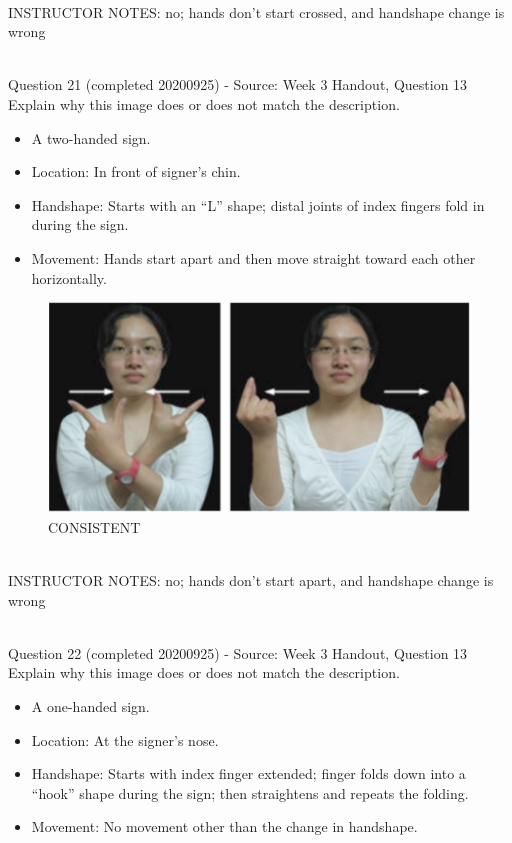 \documentclass[12pt]{article}
\begin{document}
~\\
INSTRUCTOR NOTES: no; hands don't start crossed, and handshape change is wrong


~\\

{\large Question 21} (completed 20200925) - Source: Week 3 Handout, Question 13\\

Explain why this image does or does not match the description.\\

\begin{itemize} \item A two-handed sign. \item Location: In front of signer’s chin. \item Handshape: Starts with an “L” shape; distal joints of index fingers fold in during the sign. \item Movement: Hands start apart and then move straight toward each other horizontally. \end{itemize}

\begin{figure}[H]
\includegraphics{../images/taiwansign_consistent.png}
\caption{CONSISTENT}
\end{figure}

~\\
INSTRUCTOR NOTES: no; hands don't start apart, and handshape change is wrong


~\\

{\large Question 22} (completed 20200925) - Source: Week 3 Handout, Question 13\\

Explain why this image does or does not match the description.\\

\begin{itemize} \item A one-handed sign. \item Location: At the signer’s nose. \item Handshape: Starts with index finger extended; finger folds down into a “hook” shape during the sign; then straightens and repeats the folding. \item Movement: No movement other than the change in handshape. \end{itemize}
\end{document}
